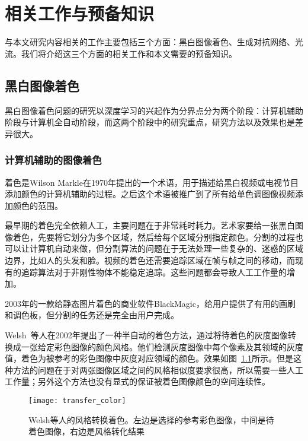 \chapter{相关工作与预备知识}
\label{cha:2-related}

  与本文研究内容相关的工作主要包括三个方面：黑白图像着色、生成对抗网络、光流。我们将介绍这三个方面的相关工作和本文需要的预备知识。

\section{黑白图像着色}
\label{sec:2-image-color}

  黑白图像着色问题的研究以深度学习的兴起作为分界点分为两个阶段：计算机辅助阶段与计算机全自动阶段，而这两个阶段中的研究重点，研究方法以及效果也是差异很大。

\subsection{计算机辅助的图像着色}
\label{sec:2-user-guided-color}
  
  着色是Wilson Markle在1970年提出的一个术语，用于描述给黑白视频或电视节目添加颜色的计算机辅助的过程。之后这个术语被推广到了所有给单色调图像视频添加颜色的范围。

  最早期的着色完全依赖人工，主要问题在于非常耗时耗力。艺术家要给一张黑白图像着色，先要将它划分为多个区域，然后给每个区域分别指定颜色。分割的过程也可以让计算机自动来做，但分割算法的问题在于无法处理一些复杂的、迷惑的区域边界，比如人的头发和脸。视频的着色还需要追踪区域在帧与帧之间的移动，而现有的追踪算法对于非刚性物体不能稳定追踪。这些问题都会导致人工工作量的增加。

  2003年的一款给静态图片着色的商业软件BlackMagic，给用户提供了有用的画刷和调色板，但分割的任务还是完全由用户完成。

  Welsh~\cite{DBLP:journals/tog/WelshAM02}等人在2002年提出了一种半自动的着色方法，通过将待着色的灰度图像转换成一张给定彩色图像的颜色风格。他们检测灰度图像中每个像素及其领域的灰度值，着色为被参考的彩色图像中灰度对应领域的颜色。效果如图~\ref{fig:transfer}所示。但是这种方法的问题在于对两张图像区域之间的风格相似度要求很高，所以需要一些人工工作量；另外这个方法也没有显式的保证被着色图像颜色的空间连续性。

  \begin{figure}[H]
    \centering
    \texttt{[image: transfer\_color]}
    \caption[Welsh等人的风格转换着色]{Welsh等人的风格转换着色。左边是选择的参考彩色图像，中间是待着色图像，右边是风格转化结果}
    \label{fig:transfer}
  \end{figure}

